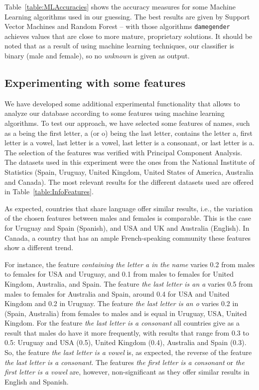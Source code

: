 \documentclass[a4paper]{article}
\begin{document}
Table~\ref{table:MLAccuracies} shows the accuracy measures for some Machine Learning algorithms used in our guessing. 
The best results are given by Support Vector Machines and Random Forest -- with those algorithms \texttt{damegender} achieves values that are close to more mature, proprietary solutions.
It should be noted that as a result of using machine learning techniques, our classifier is binary (male and female), so no \emph{unknown} is given as output.

\subsection{Experimenting with some features}

We have developed some additional experimental functionality that allows to analyze our database according to some features using machine learning algorithms.
To test our approach, we have selected some features of names, such as a being the first letter, a (or o) being the last letter, contains the letter a, first letter is a vowel, last letter is a vowel, last letter is a consonant, or last letter is a. 
The selection of the features was verified with Principal Component Analysis.
The datasets used in this experiment were the ones from the National Institute of Statistics (Spain, Uruguay, United Kingdom, United States of America, Australia and Canada).
The most relevant results for the different datasets used are offered in Table~\ref{table:InfoFeatures}.

As expected, countries that share language offer similar results, i.e., the variation of the chosen features between males and females is comparable.
This is the case for Uruguay and Spain (Spanish), and USA and UK and Australia (English).
In Canada, a country that has an ample French-speaking community these features show a different trend.

For instance, the feature \emph{containing the letter a in the name} varies 0.2 from males to females for USA and Uruguay, and 0.1 from males to females for United Kingdom, Australia, and Spain.
The feature \emph{the last letter is an a} varies 0.5 from males to females for Australia and Spain, around 0.4 for USA and United Kingdom and 0.2 in
Uruguay.
The feature \emph{the last letter is an o} varies 0.2 in (Spain, Australia) from females to males and is equal in Uruguay, USA, United Kingdom.
For the feature \emph{the last letter is a consonant} all countries give as a result that males do have it more frequently, with results that range from 0.3 to 0.5: Uruguay and USA (0.5), United Kingdom (0.4), Australia and Spain (0.3). 
So, the feature \emph{the last letter is a vowel} is, as expected, the reverse of the feature \emph{the last letter is a consonant}. 
The features \emph{the first letter is a consonant} or \emph{the first letter is a vowel} are, however, non-significant as they offer similar results in English and Spanish.
\end{document}
